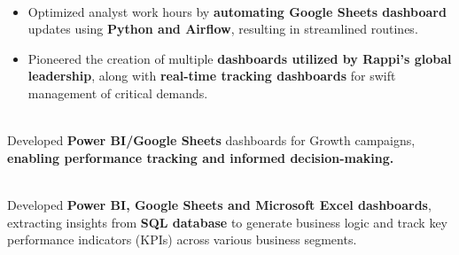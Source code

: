 
\\
\vspace{-1em}
\begin{itemize}
  \item Optimized analyst work hours by \textbf{automating Google Sheets dashboard} updates using \textbf{Python and Airflow}, resulting in streamlined routines.
  \item Pioneered the creation of multiple \textbf{dashboards utilized by Rappi's global leadership}, along with \textbf{real-time tracking dashboards} for swift management of critical demands.
\end{itemize}
\vspace{0.6em}

\\
Developed \textbf{Power BI/Google Sheets} dashboards for Growth campaigns, \textbf{enabling performance tracking and informed decision-making.}
\vspace{0.6em}

\\
Developed \textbf{Power BI, Google Sheets and Microsoft Excel dashboards}, extracting insights from \textbf{SQL database} to generate business logic and track key performance indicators (KPIs) across various business segments.
\vspace{-1.5em} %